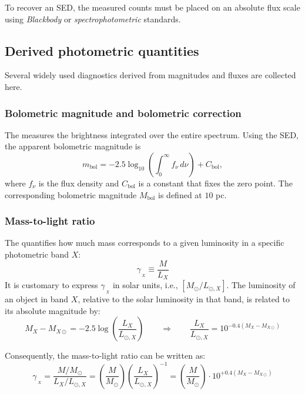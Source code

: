 \begin{tipsblock}
    To recover an  SED, the measured counts must be placed on an absolute flux scale using \textit{Blackbody} or \textit{spectrophotometric} standards.
    \end{tipsblock}

\subsection{Derived photometric quantities}

Several widely used diagnostics derived from magnitudes and fluxes are collected here.

\subsubsection{Bolometric magnitude and bolometric correction}

The  measures the brightness integrated over the entire spectrum. Using the SED, the apparent bolometric magnitude is
$$
m_\mathrm{bol} = -2.5 \log_{10}\!\left(\int_0^\infty f_\nu \, d\nu\right) + C_\mathrm{bol},
$$
where $f_\nu$ is the flux density and $C_\mathrm{bol}$ is a constant that fixes the zero point. The corresponding  bolometric magnitude $M_\mathrm{bol}$ is defined at $10$ pc.

\subsubsection{Mass-to-light ratio}

The  quantifies how much mass corresponds to a given luminosity in a specific photometric band $X$:
$$
\gamma_{\,_{X}} \equiv \frac{M}{L_X}
$$
It is customary to express $\gamma_{\,_{X}}$ in solar units, i.e., $[M_\odot / L_{\odot, X}]$. The luminosity of an object in band $X$, relative to the solar luminosity in that band, is related to its absolute magnitude by:
$$
M_X - M_{X\odot} = -2.5 \log \left( \frac{L_X}{L_{\odot, X}} \right)
\qquad \Rightarrow \qquad
\frac{L_X}{L_{\odot, X}} = 10^{-0.4 (M_X - M_{X\odot})}
$$

Consequently, the mass-to-light ratio can be written as:
$$
\gamma_{\,_{X}} = \frac{M / M_\odot}{L_X / L_{\odot, X}} = \left(\frac{M}{M_\odot}\right) \left(\frac{L_X}{L_{\odot, X}}\right)^{-1} = \left(\frac{M}{M_\odot}\right) \cdot 10^{+0.4 (M_X - M_{X\odot})}
$$

